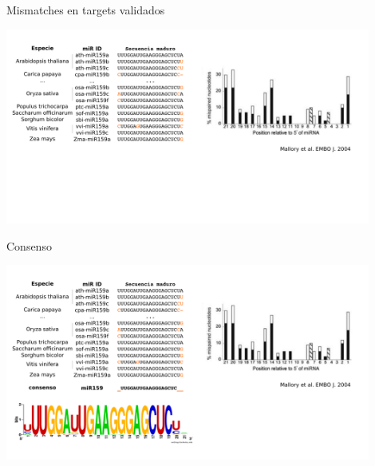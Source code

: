 \documentclass{beamer}
\begin{document}
\begin{frame}{Mismatches en targets validados}
    \begin{center}
{\includegraphics[width=0.9\textwidth]{img/variacion01.png}}
    \end{center}
\end{frame}

\begin{frame}{Consenso}
    \begin{center}
{\includegraphics[width=0.9\textwidth]{img/variacion02.png}}
    \end{center}
\end{frame}

\end{document}
